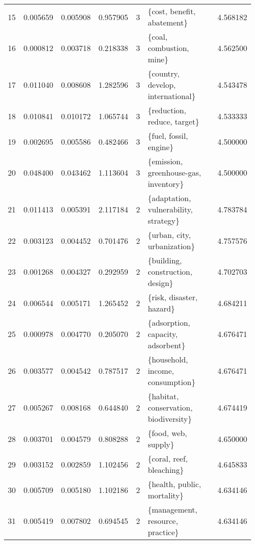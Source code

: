 \begin{tabular}{lrrrrlr}
15  &    0.005659 &  0.005908 &        0.957905 &           3 &              \{cost, benefit, abatement\} &  4.568182 \\
16  &    0.000812 &  0.003718 &        0.218338 &           3 &                \{coal, combustion, mine\} &  4.562500 \\
17  &    0.011040 &  0.008608 &        1.282596 &           3 &       \{country, develop, international\} &  4.543478 \\
18  &    0.010841 &  0.010172 &        1.065744 &           3 &             \{reduction, reduce, target\} &  4.533333 \\
19  &    0.002695 &  0.005586 &        0.482466 &           3 &                  \{fuel, fossil, engine\} &  4.500000 \\
20  &    0.048400 &  0.043462 &        1.113604 &           3 &   \{emission, greenhouse-gas, inventory\} &  4.500000 \\
21  &    0.011413 &  0.005391 &        2.117184 &           2 &   \{adaptation, vulnerability, strategy\} &  4.783784 \\
22  &    0.003123 &  0.004452 &        0.701476 &           2 &             \{urban, city, urbanization\} &  4.757576 \\
23  &    0.001268 &  0.004327 &        0.292959 &           2 &        \{building, construction, design\} &  4.702703 \\
24  &    0.006544 &  0.005171 &        1.265452 &           2 &                \{risk, disaster, hazard\} &  4.684211 \\
25  &    0.000978 &  0.004770 &        0.205070 &           2 &       \{adsorption, capacity, adsorbent\} &  4.676471 \\
26  &    0.003577 &  0.004542 &        0.787517 &           2 &        \{household, income, consumption\} &  4.676471 \\
27  &    0.005267 &  0.008168 &        0.644840 &           2 &   \{habitat, conservation, biodiversity\} &  4.674419 \\
28  &    0.003701 &  0.004579 &        0.808288 &           2 &                     \{food, web, supply\} &  4.650000 \\
29  &    0.003152 &  0.002859 &        1.102456 &           2 &                \{coral, reef, bleaching\} &  4.645833 \\
30  &    0.005709 &  0.005180 &        1.102186 &           2 &             \{health, public, mortality\} &  4.634146 \\
31  &    0.005419 &  0.007802 &        0.694545 &           2 &        \{management, resource, practice\} &  4.634146 \\

\end{tabular}
